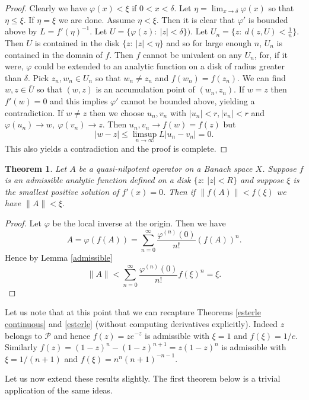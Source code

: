 \documentclass[12pt]{amsart}
\newtheorem{thm}{Theorem}[section]
\begin{document}
\begin{proof} Clearly we have $\varphi(x)<\xi$ if $0<x<\delta$.  Let
$\eta=\lim_{x\to \delta}\varphi(x)$ so that $\eta\le \xi$. If
$\eta=\xi$ we are done. Assume $\eta<\xi$. Then it is clear that
$\varphi'$ is bounded above by $L=f'(\eta)^{-1}$. Let
$U=\{\varphi(z):\ |z|<\delta\})$. Let $U_n=\{z:\
d(z,U)<\frac1n\}$. Then $U$ is contained in the disk $\{z:\
|z|<\eta\}$ and so for large enough $n$, $U_n$ is contained in the
domain of $f$.  Then $f$ cannot be univalent on any $U_n$, for, if
it were, $\varphi$ could be extended to an analytic function on a
disk of radius greater than $\delta$.  Pick $z_n,w_n\in U_n$ so
that $w_n\neq z_n$ and $f(w_n)=f(z_n)$.   We can find $w,z\in
\overline{U}$ so that $(w,z)$ is an accumulation point of
$(w_n,z_n)$.  If $w=z$ then $f'(w)=0$ and this implies $\varphi'$
cannot be bounded above, yielding a contradiction.  If $w\neq z$
then we choose $u_n,v_n$ with $|u_n|<r, |v_n|<r$ and
$\varphi(u_n)\to w,\ \varphi(v_n)\to z$.  Then $u_n,v_n\to
f(w)=f(z)$ but
$$ |w-z|\le \limsup_{n\to\infty}L|u_n-v_n|=0.$$  This also yields
a contradiction and the proof is complete.\end{proof}

\begin{thm}\label{nilpotent}  Let $A$ be a quasi-nilpotent operator on a Banach
space $X$.  Suppose $f$ is an admissible analytic function defined
on a disk $\{z:\ |z|<R\}$ and suppose $\xi$ is the smallest
positive solution of $f'(x)=0$.  Then if $\|f(A)\|<f(\xi)$ we have
$\|A\|< \xi$.\end{thm}

\begin{proof} Let $\varphi$ be the local inverse at the origin.
Then we have
$$
A=\varphi(f(A))=\sum_{n=0}^{\infty}\frac{\varphi^{(n)}(0)}{n!}(f(A))^n.$$
Hence by Lemma \ref{admissible}
$$ \|A\|<
\sum_{n=0}^{\infty}\frac{\varphi^{(n)}(0)}{n!}f(\xi)^n=\xi.$$
\end{proof}

Let us note that at this point that we can recapture Theorems
\ref{esterle continuous} and \ref{esterle} (without computing
derivatives explicitly).  Indeed $z$ belongs to $\mathcal P$ and
hence $f(z)=ze^{-z}$ is admissible with $\xi=1$ and $f(\xi)=1/e$.
Similarly $ f(z)=(1-z)^n-(1-z)^{n+1}=z(1-z)^n$ is admissible with
$\xi=1/(n+1)$ and $f(\xi)=n^n(n+1)^{-n-1}$.

Let us now extend these results slightly.  The first theorem below
is a trivial application of the same ideas.
\end{document}
